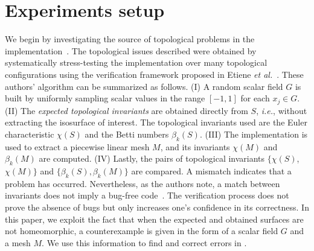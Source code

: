 \section{Experiments setup}
\label{experiments_setup}

We begin by investigating the source of topological problems in the \mc{} implementation~\cite{Etiene:2012:TVI:2197070.2197097}.
%
%
The topological issues described were obtained by systematically stress-testing the \mc{} implementation over many topological configurations using the verification framework proposed in Etiene \emph{et al.}~\cite{Etiene:2012:TVI:2197070.2197097}. These authors' algorithm can be summarized as follows.
%
(I) A random scalar field $G$ is built by uniformly sampling scalar values in the range $[-1,1]$ for each $x_j \in G$.
%
(II) The \emph{expected topological invariants} are obtained directly from $S$, {\em i.e.}, without extracting the isosurface of interest. The topological invariants used are the Euler characteristic $\chi(S)$ and the Betti numbers $\beta_k(S)$. 
%
(III) The \mc{} implementation is used to extract a piecewise linear mesh $M$, and its invariants $\chi(M)$ and $\beta_k(M)$ are computed.
%
(IV) Lastly, the pairs of topological invariants $\{\chi(S)$, $\chi(M)\}$ and $\{\beta_k(S), \beta_k(M)\}$ are compared. A mismatch indicates that a problem has occurred. Nevertheless,  as the authors note, a match between invariants does not imply a bug-free code~\cite{Etiene:2012:TVI:2197070.2197097}. The verification process does not prove the absence of bugs but only increases one's confidence in its correctness.
%
In this paper, we exploit the fact that when the expected and obtained surfaces are not homeomorphic, a counterexample is given in the form of a scalar field $G$ and a mesh $M$. We use this information to find and correct errors in \mc{}.


